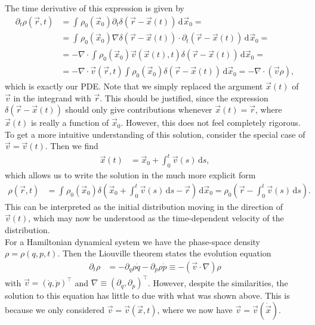 \documentclass[english, parskip=full]{scrartcl}
\newcommand{\intx}{}
\newcommand{\intr}{}
\newcommand{\kla}{}
\begin{document}
The time derivative of this expression is given by
\begin{align}
\partial_t\rho(\vec{r},t) &= \intr\int_{} \rho_0(\vec{x}_0)\partial_t\delta\kla\left( \vec{r} - \vec{x}(t) \right) \, \mathrm{d}^{ }\vec{x}_0 = \\
&= \intr\int_{} \rho_0(\vec{x}_0) \nabla \delta\kla\left( \vec{r} - \vec{x}(t) \right) \cdot \partial_t\kla\left( \vec{r} - \vec{x}(t) \right)  \, \mathrm{d}^{ }\vec{x}_0 = \\
&= -\nabla\cdot \intx\int_{ }^{ } \rho_0(\vec{x}_0) \vec{v}\kla\left( \vec{x}(t), t \right) \delta\kla\left( \vec{r} - \vec{x}(t) \right) \, \mathrm{d}\vec{x}_0 = \\
&= -\nabla\cdot \vec{v}\kla\left( \vec{r}, t \right)\intx\int_{ }^{ } \rho_0(\vec{x}_0)  \delta\kla\left( \vec{r} - \vec{x}(t) \right) \, \mathrm{d}\vec{x}_0 = -\nabla\cdot\kla\left( \vec{v}\rho \right),
\end{align}
which is exactly our PDE.
Note that we simply replaced the argument $\vec{x}(t)$ of $\vec{v}$ in the integrand with $\vec{r}$.
This should be justified, since the expression $\delta\kla\left( \vec{r} - \vec{x}(t) \right)$ should only give contributions whenever $\vec{x}(t) = \vec{r}$, where $\vec{x}(t)$ is really a function of $\vec{x}_0$.
However, this does not feel completely rigorous.
\\
To get a more intuitive understanding of this solution, consider the special case of $\vec{v} = \vec{v}(t)$.
Then we find 
\begin{align}
\vec{x}(t) &= \vec{x}_0 + \intx\int_{0}^{t}\vec{v}(s)\, \mathrm{d}s,
\end{align} 
which allows us to write the solution in the much more explicit form
\begin{align}
\rho(\vec{r},t) &= \intx\int_{ }^{ }\rho_0(\vec{x}_0) \delta\kla\left( \vec{x}_0 + \intx\int_{0}^{t}\vec{v}(s)\, \mathrm{d}s - \vec{r} \right) \, \mathrm{d}\vec{x}_0 = \rho_0\kla\left( \vec{r} - \intx\int_{0}^{t}\vec{v}(s)\, \mathrm{d}s \right).
\end{align}
This can be interpreted as the initial distribution moving in the direction of $\vec{v}(t)$, which may now be understood as the time-dependent velocity of the distribution.
\\
For a Hamiltonian dynamical system we have the phase-space density $\rho=\rho(q,p,t)$.
Then the Liouville theorem states the evolution equation
\begin{align}
\partial_t\rho &= -\partial_q\rho\dot{q} - \partial_p\rho\dot{p}\equiv -\kla\left( \vec{v}\cdot\nabla \right)\rho
\end{align}
with $\vec{v} = (\dot{q},\dot{p})^\top$ and $\nabla \equiv (\partial_q, \partial_p)^\top$.
However, despite the similarities, the solution to this equation has little to due with what was shown above.
This is because we only considered $\vec{v}=\vec{v}(\vec{x},t)$, where we now have $\vec{v}=\vec{v}(\dot{\vec{x}})$.
\end{document}
